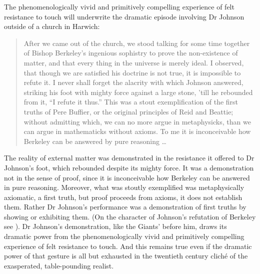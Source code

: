 \documentclass[12pt]{article}
\begin{document}
The phenomenologically vivid and primitively compelling experience of felt resistance to touch will underwrite the dramatic episode involving Dr Johnson outside of a church in Harwich:
\begin{quote}
	After we came out of the church, we stood talking for some time together of Bishop Berkeley’s ingenious sophistry to prove the non-existence of matter, and that every thing in the universe is merely ideal. I observed, that though we are satisfied his doctrine is not true, it is impossible to refute it. I never shall forget the alacrity with which Johnson answered, striking his foot with mighty force against a large stone, ’till he rebounded from it, ``I refute it thus.'' This was a stout exemplification of the first truths of Pere Buffier, or the original principles of Reid and Beattie; without admitting which, we can no more argue in metaphysicks, than we can argue in mathematicks without axioms. To me it is inconceivable how Berkeley can be answered by pure reasoning \ldots \citep[\textsc{i} 471]{Boswell:1935fk}
\end{quote}
The reality of external matter was demonstrated in the resistance it offered to Dr Johnson’s foot, which rebounded despite its mighty force. It was a demonstration not in the sense of proof, since it is inconceivable how Berkeley can be answered in pure reasoning. Moreover, what was stoutly exemplified was metaphysically axiomatic, a first truth, but proof proceeds from axioms, it does not establish them. Rather Dr Johnson’s performance was a demonstration of first truths by showing or exhibiting them. (On the character of Johnson’s refutation of Berkeley see \citealt{Patey:1986uq}). Dr Johnson's demonstration, like the Giants' before him, draws its dramatic power from the phenomenologically vivid and primitively compelling experience of felt resistance to touch. And this remains true even if the dramatic power of that gesture is all but exhausted in the twentieth century clich\'{e} of the exasperated, table-pounding realist.
\end{document}
